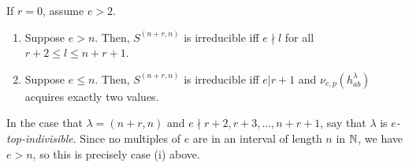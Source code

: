 \documentclass{amsart}
\begin{document}
  \begin{corollary}\label{S irreducibility}
    If $r = 0$, assume $e > 2$.
    \begin{enumerate}[label={(\roman*)}]
      \item Suppose $e > n$.
        Then, $S^{(n+r,n)}$ is irreducible iff $e \nmid l$ for all $r + 2 \leq l \leq n + r + 1$.
      \item Suppose $e \leq n$.
        Then, $S^{(n+r,n)}$ is irreducible iff $e | r + 1$ and $\nu_{e,p}(h_{ab}^\lambda)$ acquires exactly two values.
    \end{enumerate}  
  \end{corollary}
  In the case that $\lambda = (n+r,n)$ and $e \nmid r+2,r+3,\dots,n+r+1$, say that $\lambda$ is \emph{$e$-top-indivisible}.
  Since no multiples of $e$ are in an interval of length $n$ in $\mathbb{N}$, we have $e > n$, so this is precisely case (i) above.
\end{document}
